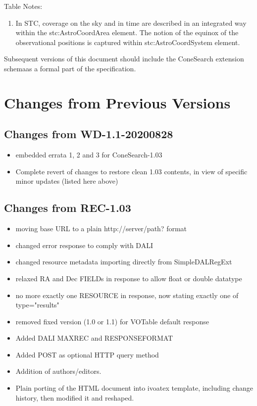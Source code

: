 \documentclass[11pt,a4paper]{ivoa}
\begin{document}
Table Notes:
\begin{enumerate}
	\item In STC, coverage on the sky and in
		time are described in an integrated way within the stc:AstroCoordArea
		element. The notion of the equinox of the observational positions is
		captured within stc:AstroCoordSystem element.
\end{enumerate} 

Subsequent versions of this document should include the ConeSearch extension 
schemaas a formal part of the specification.

\section{Changes from Previous Versions}

\subsection*{Changes from WD-1.1-20200828}
\begin{itemize}
	\item embedded errata 1, 2 and 3 for ConeSearch-1.03
	\item Complete revert of changes to restore clean 1.03 contents,
		in view of specific minor updates (listed here above)
\end{itemize}

\subsection*{Changes from REC-1.03}
\label{appendix:first11changes}
\begin{itemize}
	\item moving base URL to a plain http://server/path? format
	\item changed error response to comply with DALI
	\item changed resource metadata importing directly from SimpleDALRegExt
	\item relaxed RA and Dec FIELDs in response to allow float or double datatype
	\item no more exactly one RESOURCE in response, now stating exactly one of
		type="results"
	\item removed fixed version (1.0 or 1.1) for VOTable default response
	\item Added DALI MAXREC and RESPONSEFORMAT
	\item Added POST as optional HTTP query method
	\item Addition of authors/editors.
	\item Plain porting of the HTML document into ivoatex template,
		including change history, then modified it and reshaped.
\end{itemize}
\end{document}
